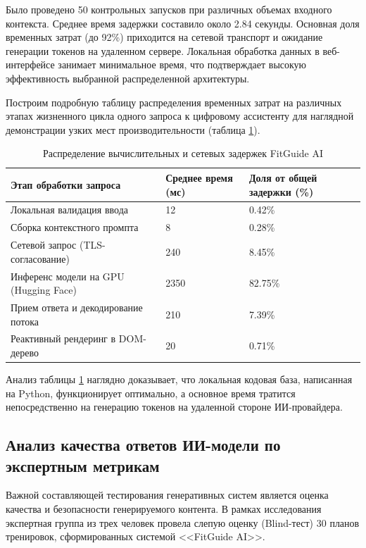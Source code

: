 \documentclass[14pt, a4paper]{extarticle}
\begin{document}
Было проведено 50 контрольных запусков при различных объемах входного контекста. Среднее время задержки составило около 2.84 секунды. Основная доля временных затрат (до 92\%) приходится на сетевой транспорт и ожидание генерации токенов на удаленном сервере. Локальная обработка данных в веб-интерфейсе занимает минимальное время, что подтверждает высокую эффективность выбранной распределенной архитектуры.

Построим подробную таблицу распределения временных затрат на различных этапах жизненного цикла одного запроса к цифровому ассистенту для наглядной демонстрации узких мест производительности (таблица \ref{tab:delays}).

\begin{table}[H]
\centering
\caption{Распределение вычислительных и сетевых задержек FitGuide AI}
\label{tab:delays}
\bigskip
\begin{tabular}{|p{5cm}|p{4cm}|p{5cm}|}
\hline
\textbf{Этап обработки запроса} & \textbf{Среднее время (мс)} & \textbf{Доля от общей задержки (\%)} \\ \hline
Локальная валидация ввода & 12 & 0.42\% \\ \hline
Сборка контекстного промпта & 8 & 0.28\% \\ \hline
Сетевой запрос (TLS-согласование) & 240 & 8.45\% \\ \hline
Инференс модели на GPU (Hugging Face) & 2350 & 82.75\% \\ \hline
Прием ответа и декодирование потока & 210 & 7.39\% \\ \hline
Реактивный рендеринг в DOM-дерево & 20 & 0.71\% \\ \hline
\end{tabular}
\end{table}

Анализ таблицы \ref{tab:delays} наглядно доказывает, что локальная кодовая база, написанная на Python, функционирует оптимально, а основное время тратится непосредственно на генерацию токенов на удаленной стороне ИИ-провайдера.


\subsection{Анализ качества ответов ИИ-модели по экспертным метрикам}

Важной составляющей тестирования генеративных систем является оценка качества и безопасности генерируемого контента. В рамках исследования экспертная группа из трех человек провела слепую оценку (Blind-тест) 30 планов тренировок, сформированных системой <<FitGuide AI>>.
\end{document}

